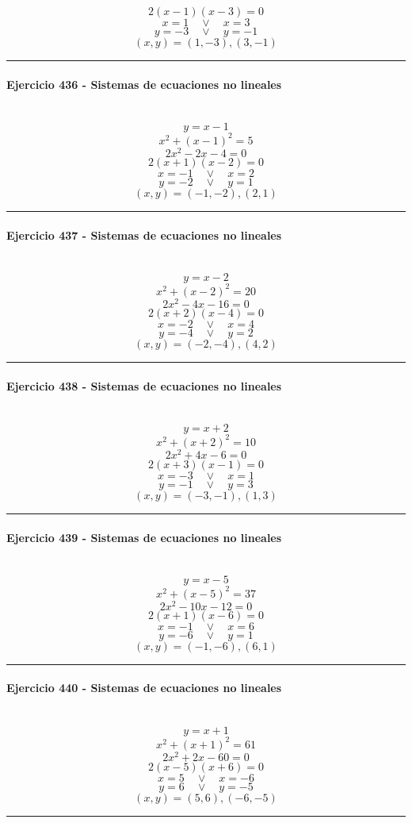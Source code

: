 \documentclass[10pt,a4paper]{article}
\newcommand{\res}[1]{\paragraph{#1}\mbox{}\\[-1.2em]}
\begin{document}
\[ 2(x-1)(x-3)=0 \]
\[ x=1\quad \vee \quad x=3 \]
\[ y=-3\quad \vee \quad y=-1 \]
\[ \boxed{(x,y)=(1,-3),(3,-1)} \]
\vspace{1mm}\hrule\vspace{2mm}
\res{Ejercicio 436 - Sistemas de ecuaciones no lineales}
\[ y=x-1 \]
\[ x^2+(x-1)^2=5 \]
\[ 2 x^{2} - 2 x - 4=0 \]
\[ 2(x+1)(x-2)=0 \]
\[ x=-1\quad \vee \quad x=2 \]
\[ y=-2\quad \vee \quad y=1 \]
\[ \boxed{(x,y)=(-1,-2),(2,1)} \]
\vspace{1mm}\hrule\vspace{2mm}
\res{Ejercicio 437 - Sistemas de ecuaciones no lineales}
\[ y=x-2 \]
\[ x^2+(x-2)^2=20 \]
\[ 2 x^{2} - 4 x - 16=0 \]
\[ 2(x+2)(x-4)=0 \]
\[ x=-2\quad \vee \quad x=4 \]
\[ y=-4\quad \vee \quad y=2 \]
\[ \boxed{(x,y)=(-2,-4),(4,2)} \]
\vspace{1mm}\hrule\vspace{2mm}
\res{Ejercicio 438 - Sistemas de ecuaciones no lineales}
\[ y=x+2 \]
\[ x^2+(x+2)^2=10 \]
\[ 2 x^{2} + 4 x - 6=0 \]
\[ 2(x+3)(x-1)=0 \]
\[ x=-3\quad \vee \quad x=1 \]
\[ y=-1\quad \vee \quad y=3 \]
\[ \boxed{(x,y)=(-3,-1),(1,3)} \]
\vspace{1mm}\hrule\vspace{2mm}
\res{Ejercicio 439 - Sistemas de ecuaciones no lineales}
\[ y=x-5 \]
\[ x^2+(x-5)^2=37 \]
\[ 2 x^{2} - 10 x - 12=0 \]
\[ 2(x+1)(x-6)=0 \]
\[ x=-1\quad \vee \quad x=6 \]
\[ y=-6\quad \vee \quad y=1 \]
\[ \boxed{(x,y)=(-1,-6),(6,1)} \]
\vspace{1mm}\hrule\vspace{2mm}
\res{Ejercicio 440 - Sistemas de ecuaciones no lineales}
\[ y=x+1 \]
\[ x^2+(x+1)^2=61 \]
\[ 2 x^{2} + 2 x - 60=0 \]
\[ 2(x-5)(x+6)=0 \]
\[ x=5\quad \vee \quad x=-6 \]
\[ y=6\quad \vee \quad y=-5 \]
\[ \boxed{(x,y)=(5,6),(-6,-5)} \]
\vspace{1mm}\hrule\vspace{2mm}
\end{document}
